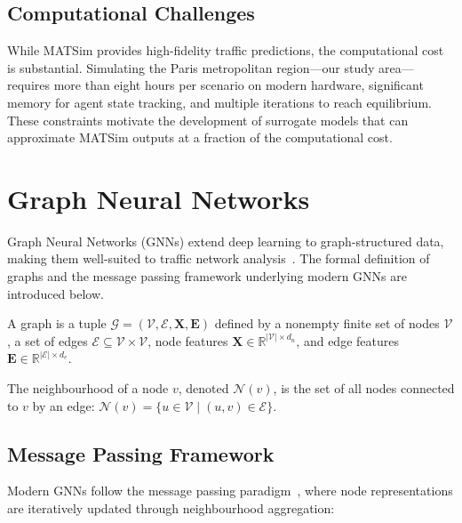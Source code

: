 \subsection{Computational Challenges}

While MATSim provides high-fidelity traffic predictions, the computational cost is substantial. Simulating the Paris metropolitan region---our study area---requires more than eight hours per scenario on modern hardware, significant memory for agent state tracking, and multiple iterations to reach equilibrium. These constraints motivate the development of surrogate models that can approximate MATSim outputs at a fraction of the computational cost.

\section{Graph Neural Networks}\label{sec:gnn}

Graph Neural Networks (GNNs) extend deep learning to graph-structured data, making them well-suited to traffic network analysis~\cite{scarselli2009graph, kipf2017semi, wu2020comprehensive}. The formal definition of graphs and the message passing framework underlying modern GNNs are introduced below.

\begin{definition}[Graph]
A graph is a tuple $\mathcal{G} = (\mathcal{V}, \mathcal{E}, \mathbf{X}, \mathbf{E})$ defined by a nonempty finite set of nodes $\mathcal{V}$, a set of edges $\mathcal{E} \subseteq \mathcal{V} \times \mathcal{V}$, node features $\mathbf{X} \in \mathbb{R}^{|\mathcal{V}| \times d_n}$, and edge features $\mathbf{E} \in \mathbb{R}^{|\mathcal{E}| \times d_e}$.
\end{definition}

The neighbourhood of a node $v$, denoted $\mathcal{N}(v)$, is the set of all nodes connected to $v$ by an edge: $\mathcal{N}(v) = \{u \in \mathcal{V} \mid (u, v) \in \mathcal{E}\}$.

\subsection{Message Passing Framework}

Modern GNNs follow the message passing paradigm~\cite{gilmer2017neural}, where node representations are iteratively updated through neighbourhood aggregation:

